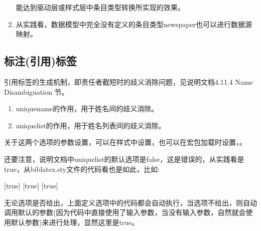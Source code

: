 \begin{enumerate}
            能达到驱动层或样式层中条目类型转换所实现的效果。
            \begin{texlist}
            \DeclareStyleSourcemap{
                \maps[datatype=bibtex]{
                    \map{%
                    \step[typesource=newspaper, typetarget=article, final]
                    }
                }
            }
            \end{texlist}

      \item 从实践看，数据模型中完全没有定义的条目类型newspaper也可以进行数据源映射。
  \end{enumerate}

\subsection{标注(引用)标签}
引用标签的生成机制，即责任者截短时的歧义消除问题，见说明文档4.11.4 Name Disambiguation 节。
  \begin{enumerate}
    \item uniquename的作用，用于姓名间的歧义消除。
    \item uniquelist的作用，用于姓名列表间的歧义消除。
  \end{enumerate}


关于这两个选项的参数设置，可以在样式中设置，也可以在宏包加载时设置，。

还要注意，说明文档中uniquelist的默认选项是false，这是错误的，从实践看是true，从biblatex.sty文件的代码看也是如此，比如:
\begin{texlist}
[true]{%
    {}
    {}}
[true]{%
    {}
    {}}
[true]{%
    {}
    {}}
\def\blx@opt@uniquelist@false{0}
\def\blx@opt@uniquelist@true{1}
\def\blx@opt@uniquelist@minyear{2}
\end{texlist}
无论选项是否给出，上面定义选项中的代码都会自动执行，当选项不给出，则自动调用默认的参数(因为代码中直接使用了输入参数，当没有输入参数，自然就会使用默认参数)来进行处理，显然这里是true。

